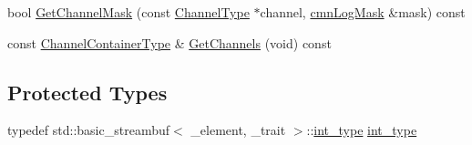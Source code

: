 \begin{DoxyCompactItemize}
\item 
bool \hyperlink{classcmn_l_o_d_multiplexer_streambuf_a12522abcbc62cea5e20d821e66f15eb9}{Get\+Channel\+Mask} (const \hyperlink{classcmn_l_o_d_multiplexer_streambuf_aa3b0347701c1aa5157a719978a1a6386}{Channel\+Type} $\ast$channel, \hyperlink{cmn_log_lo_d_8h_a44b6ef7560b0d204460b0a54f1a5d702}{cmn\+Log\+Mask} \&mask) const 
\item 
const \hyperlink{classcmn_l_o_d_multiplexer_streambuf_a2fd9fe59de3be9b8cf5546ac2b0e41bb}{Channel\+Container\+Type} \& \hyperlink{classcmn_l_o_d_multiplexer_streambuf_ad141a1587b36db6be88a1199e2441a36}{Get\+Channels} (void) const 
\end{DoxyCompactItemize}
\subsection*{Protected Types}
\begin{DoxyCompactItemize}
\item 
typedef std\+::basic\+\_\+streambuf$<$ \+\_\+element, \+\_\+trait $>$\+::\hyperlink{classcmn_l_o_d_multiplexer_streambuf_a8d1eadc5cf72b594aa2c2fef6401fe47}{int\+\_\+type} \hyperlink{classcmn_l_o_d_multiplexer_streambuf_a8d1eadc5cf72b594aa2c2fef6401fe47}{int\+\_\+type}
\end{DoxyCompactItemize}
